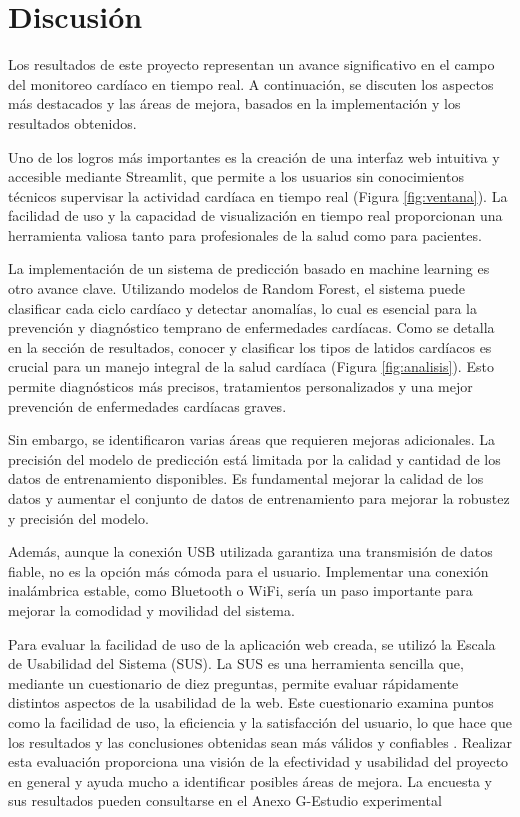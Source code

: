 \section{Discusión}

Los resultados de este proyecto representan un avance significativo en el campo del monitoreo cardíaco en tiempo real. A continuación, se discuten los aspectos más destacados y las áreas de mejora, basados en la implementación y los resultados obtenidos.

Uno de los logros más importantes es la creación de una interfaz web intuitiva y accesible mediante Streamlit, que permite a los usuarios sin conocimientos técnicos supervisar la actividad cardíaca en tiempo real (Figura \ref{fig:ventana}). La facilidad de uso y la capacidad de visualización en tiempo real proporcionan una herramienta valiosa tanto para profesionales de la salud como para pacientes.

La implementación de un sistema de predicción basado en machine learning es otro avance clave. Utilizando modelos de Random Forest, el sistema puede clasificar cada ciclo cardíaco y detectar anomalías, lo cual es esencial para la prevención y diagnóstico temprano de enfermedades cardíacas. Como se detalla en la sección de resultados, conocer y clasificar los tipos de latidos cardíacos es crucial para un manejo integral de la salud cardíaca (Figura \ref{fig:analisis}). Esto permite diagnósticos más precisos, tratamientos personalizados y una mejor prevención de enfermedades cardíacas graves.

Sin embargo, se identificaron varias áreas que requieren mejoras adicionales. La precisión del modelo de predicción está limitada por la calidad y cantidad de los datos de entrenamiento disponibles. Es fundamental mejorar la calidad de los datos y aumentar el conjunto de datos de entrenamiento para mejorar la robustez y precisión del modelo.

Además, aunque la conexión USB utilizada garantiza una transmisión de datos fiable, no es la opción más cómoda para el usuario. Implementar una conexión inalámbrica estable, como Bluetooth o WiFi, sería un paso importante para mejorar la comodidad y movilidad del sistema.

Para evaluar la facilidad de uso de la aplicación web creada, se utilizó la Escala de Usabilidad del Sistema (SUS). La SUS es una herramienta sencilla que, mediante un cuestionario de diez preguntas, permite evaluar rápidamente distintos aspectos de la usabilidad de la web. Este cuestionario examina puntos como la facilidad de uso, la eficiencia y la satisfacción del usuario, lo que hace que los resultados y las conclusiones obtenidas sean más válidos y confiables \cite{Brooke}. Realizar esta evaluación proporciona una visión de la efectividad y usabilidad del proyecto en general y ayuda mucho a identificar posibles áreas de mejora. La encuesta y sus resultados pueden consultarse en el Anexo G-Estudio experimental

